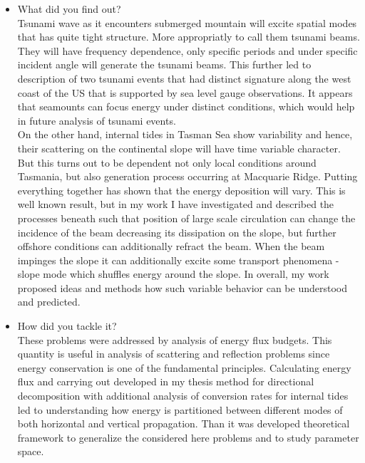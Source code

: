 \begin{itemize}
\item What did you find out?\\
Tsunami wave as it encounters submerged mountain will excite spatial modes that has quite tight structure. More appropriatly to call them tsunami beams. They will have frequency dependence, only specific periods and under specific incident angle will generate the tsunami beams. This further led to description of two tsunami events that had distinct signature along the west coast of the US that is supported by sea level gauge observations. It appears that seamounts can focus energy under distinct conditions, which would help in future analysis of tsunami events.\\
On the other hand, internal tides in Tasman Sea show variability and hence, their scattering on the continental slope will have time variable character. But this turns out to be dependent not only local conditions around Tasmania, but also generation process occurring at Macquarie Ridge. Putting everything together has shown that the energy deposition will vary. This is well known result, but in my work I have investigated and described the processes beneath such that position of large scale circulation can change the incidence of the beam decreasing its dissipation on the slope, but further offshore conditions can additionally refract the beam. When the beam impinges the slope it can additionally excite some transport phenomena - slope mode which shuffles energy around the slope. In overall, my work proposed ideas and methods how such variable behavior can be understood and predicted.

\item How did you tackle it?\\
These problems were addressed by analysis of energy flux budgets. This quantity is useful in analysis of scattering and reflection problems since energy conservation is one of the fundamental principles. Calculating energy flux and carrying out developed in my thesis method for directional decomposition with additional analysis of conversion rates for internal tides led to understanding how energy is partitioned between different modes of both horizontal and vertical propagation. Than it was developed theoretical framework to generalize the considered here problems and to study parameter space.
\end{itemize}

